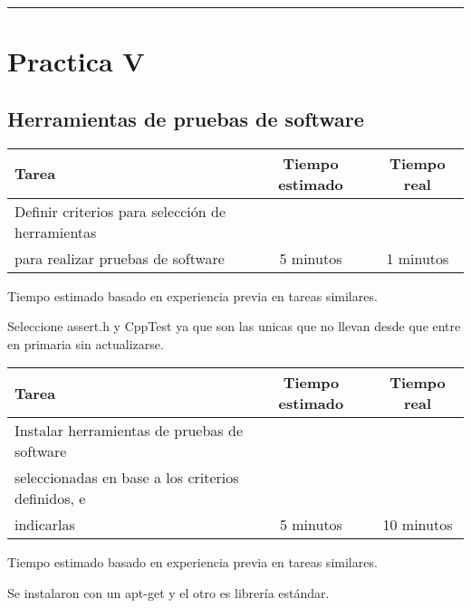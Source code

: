 \documentclass[12pt,a4paper]{article}
\newcommand{\separadorseccion}{%
    \vspace{1em}
    \hrule
    \vspace{1em}
}
\begin{document}
\separadorseccion


\section{Practica V}
\subsection{Herramientas de pruebas de software}
    \begin{center}
        \begin{tabular}{|l|c|c|}
            \hline
            \textbf{Tarea} & \textbf{Tiempo estimado} & \textbf{Tiempo real} \\
            \hline
            Definir criterios para selección de herramientas
\\para realizar pruebas de software & 5 minutos & 1 minutos \\
            \hline
        \end{tabular}
    \end{center}
    \begin{center}
        Tiempo estimado basado en experiencia previa en tareas similares.
    \end{center}
Seleccione assert.h y CppTest ya que son las unicas que no llevan desde que entre en primaria sin actualizarse.
    \begin{center}
        \begin{tabular}{|l|c|c|}
            \hline
            \textbf{Tarea} & \textbf{Tiempo estimado} & \textbf{Tiempo real} \\
            \hline
            Instalar herramientas de pruebas de software 
\\seleccionadas en base a los criterios definidos, e
\\indicarlas & 5 minutos & 10 minutos \\
            \hline
        \end{tabular}
    \end{center}
    \begin{center}
        Tiempo estimado basado en experiencia previa en tareas similares.
    \end{center}
Se instalaron con un apt-get y el otro es librería estándar.
\end{document}
